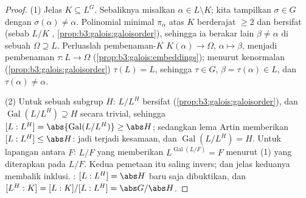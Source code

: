 \begin{proof}
(1) Jelas $K \subseteq L^G$. Sebaliknya misalkan $\alpha \in L
\setminus K$; kita tampilkan $\sigma \in G$ dengan $\sigma(\alpha) \ne
\alpha$. Polinomial minimal $\pi_\alpha$ atas $K$ berderajat
$\geq 2$ dan bersifat  (sebab $L/K$ ,
\cref{prop:b3:galois:galoisorder}), sehingga ia berakar lain
$\beta \neq \alpha$ di sebuah  $\Omega \supseteq L$.
Perluaslah pembenaman-$K$ $K(\alpha) \to \Omega$, $\alpha \mapsto
\beta$, menjadi pembenaman $\tau\colon L \to \Omega$
(\cref{prop:b3:galois:embeddings}); menurut kenormalan
(\cref{prop:b3:galois:galoisorder}) $\tau(L) = L$, sehingga $\tau \in
G$, $\beta = \tau(\alpha) \in L$, dan $\tau(\alpha) \neq
\alpha$.

(2) Untuk sebuah subgrup $H$: $L/L^H$ bersifat 
(\cref{prop:b3:galois:galoisorder}), dan
$\operatorname{Gal}(L/L^H) \supseteq H$ secara trivial, sehingga $[L:L^H] =
\abs{\operatorname{Gal}(L/L^H)} \geq \abs H$; sedangkan lema Artin
memberikan $[L:L^H] \leq \abs H$: jadi terjadi kesamaan, dan
$\operatorname{Gal}(L/L^H) = H$. Untuk lapangan antara $F$:
$L/F$ yang  memberikan $L^{\operatorname{Gal}(L/F)} = F$ menurut (1) yang diterapkan pada $L/F$.
Kedua pemetaan itu saling invers; dan jelas keduanya
membalik inklusi. : $[L:L^H] = \abs H$ baru saja
dibuktikan, dan $[L^H:K] = [L:K]/[L:L^H] = \abs G/\abs H$.


\end{proof}

